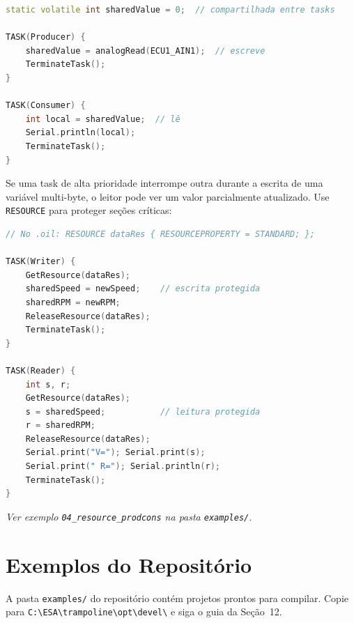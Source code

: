 \documentclass[12pt,a4paper]{article}
\begin{document}
\begin{lstlisting}[language=C++]
static volatile int sharedValue = 0;  // compartilhada entre tasks

TASK(Producer) {
    sharedValue = analogRead(ECU1_AIN1);  // escreve
    TerminateTask();
}

TASK(Consumer) {
    int local = sharedValue;  // lê
    Serial.println(local);
    TerminateTask();
}
\end{lstlisting}

\begin{notabox}
Se uma task de alta prioridade interrompe outra durante a escrita de uma variável multi-byte, o leitor pode ver um valor parcialmente atualizado. Use \texttt{RESOURCE} para proteger seções críticas:
\end{notabox}

\begin{lstlisting}[language=C++]
// No .oil: RESOURCE dataRes { RESOURCEPROPERTY = STANDARD; };

TASK(Writer) {
    GetResource(dataRes);
    sharedSpeed = newSpeed;    // escrita protegida
    sharedRPM = newRPM;
    ReleaseResource(dataRes);
    TerminateTask();
}

TASK(Reader) {
    int s, r;
    GetResource(dataRes);
    s = sharedSpeed;           // leitura protegida
    r = sharedRPM;
    ReleaseResource(dataRes);
    Serial.print("V="); Serial.print(s);
    Serial.print(" R="); Serial.println(r);
    TerminateTask();
}
\end{lstlisting}

\textit{Ver exemplo \texttt{04\_resource\_prodcons} na pasta \texttt{examples/}.}

\section{Exemplos do Repositório}

A pasta \texttt{examples/} do repositório contém projetos prontos para compilar. Copie para \texttt{C:\textbackslash ESA\textbackslash trampoline\textbackslash opt\textbackslash devel\textbackslash} e siga o guia da Seção~12.
\end{document}
